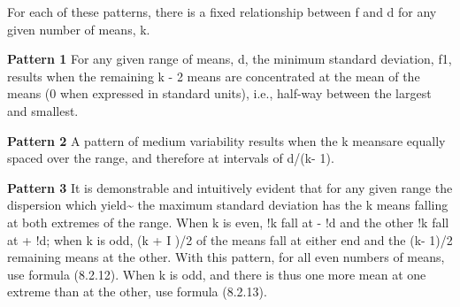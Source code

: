 \documentclass[
]{book}
\begin{document}
For each of these patterns, there is a fixed relationship between f and d for any given number of means, k.

\textbf{Pattern 1}
For any given range of means, d, the minimum standard deviation, f1, results when the remaining k - 2 means are concentrated at the mean of the means (0 when expressed in standard units), i.e., half-way between the largest and smallest.

\textbf{Pattern 2}
A pattern of medium variability results when the k meansare equally spaced over the range, and therefore at intervals of d/(k- 1).

\textbf{Pattern 3}
It is demonstrable and intuitively evident that for any given range the dispersion which yield\textasciitilde{} the maximum standard deviation has the k means falling at both extremes of the range. When k is even, !k fall at - !d and the other !k fall at + !d; when k is odd, (k + I )/2 of the means fall at either end and the (k- 1)/2 remaining means at the other. With this pattern, for all even numbers of means, use formula (8.2.12). When k is odd, and there is thus one more mean at one extreme than at the other, use formula (8.2.13).
\end{document}
